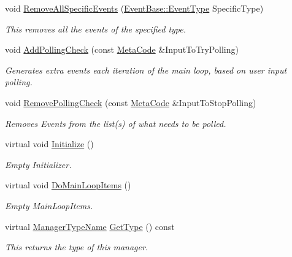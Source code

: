 \begin{DoxyCompactItemize}
void \hyperlink{classphys_1_1EventManager_ac38a5a7d003a3f92e40c842916094bde}{RemoveAllSpecificEvents} (\hyperlink{classphys_1_1EventBase_a5e6a8564e127f654123f0bf6a2751923}{EventBase::EventType} SpecificType)
\begin{DoxyCompactList}\small\item\em This removes all the events of the specified type. \item\end{DoxyCompactList}\item 
void \hyperlink{classphys_1_1EventManager_a6ff66883358344908afd11204f79f196}{AddPollingCheck} (const \hyperlink{classphys_1_1MetaCode}{MetaCode} \&InputToTryPolling)
\begin{DoxyCompactList}\small\item\em Generates extra events each iteration of the main loop, based on user input polling. \item\end{DoxyCompactList}\item 
void \hyperlink{classphys_1_1EventManager_adaf7d5346932506ed43f893eb071fd39}{RemovePollingCheck} (const \hyperlink{classphys_1_1MetaCode}{MetaCode} \&InputToStopPolling)
\begin{DoxyCompactList}\small\item\em Removes Events from the list(s) of what needs to be polled. \item\end{DoxyCompactList}\item 
virtual void \hyperlink{classphys_1_1EventManager_a51afdd83f44f461dfac5c9eca5883ea0}{Initialize} ()
\begin{DoxyCompactList}\small\item\em Empty Initializer. \item\end{DoxyCompactList}\item 
virtual void \hyperlink{classphys_1_1EventManager_aca8fb3d285484dcdb943824bf11f3596}{DoMainLoopItems} ()
\begin{DoxyCompactList}\small\item\em Empty MainLoopItems. \item\end{DoxyCompactList}\item 
virtual \hyperlink{classphys_1_1ManagerBase_aaa6ccddf23892eaccb898529414f80a5}{ManagerTypeName} \hyperlink{classphys_1_1EventManager_a194890f7f8be5d45aa98623481482696}{GetType} () const 
\begin{DoxyCompactList}\small\item\em This returns the type of this manager. \item\end{DoxyCompactList}\end{DoxyCompactItemize}
